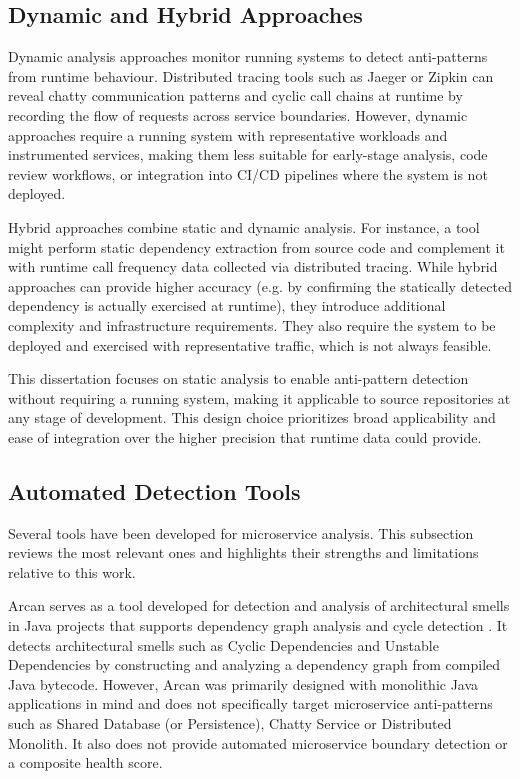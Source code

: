 \subsection{Dynamic and Hybrid Approaches}
\label{subsec:related-dynamic}

\par Dynamic analysis approaches monitor running systems to detect anti-patterns from runtime behaviour. Distributed tracing tools such as Jaeger or Zipkin can reveal chatty communication patterns and cyclic call chains at runtime by recording the flow of requests across service boundaries. However, dynamic approaches require a running system with representative workloads and instrumented services, making them less suitable for early-stage analysis, code review workflows, or integration into CI/CD pipelines where the system is not deployed.

Hybrid approaches combine static and dynamic analysis. For instance, a tool might perform static dependency extraction from source code and complement it with runtime call frequency data collected via distributed tracing. While hybrid approaches can provide higher accuracy (e.g. by confirming the statically detected dependency is actually exercised at runtime), they introduce additional complexity and infrastructure requirements. They also require the system to be deployed and exercised with representative traffic, which is not always feasible.

This dissertation focuses on static analysis to enable anti-pattern detection without requiring a running system, making it applicable to source repositories at any stage of development. This design choice prioritizes broad applicability and ease of integration over the higher precision that runtime data could provide.

\subsection{Automated Detection Tools}
\label{subsec:related-tools}

\par Several tools have been developed for microservice analysis. This subsection reviews the most relevant ones and highlights their strengths and limitations relative to this work.

\par Arcan serves as a tool developed for detection and analysis of architectural smells in Java projects that supports dependency graph analysis and cycle detection \cite{Arcelli2017}. It detects architectural smells such as Cyclic Dependencies and Unstable Dependencies by constructing and analyzing a dependency graph from compiled Java bytecode. However, Arcan was primarily designed with monolithic Java applications in mind and does not specifically target microservice anti-patterns such as Shared Database (or Persistence), Chatty Service or Distributed Monolith. It also does not provide automated microservice boundary detection or a composite health score.

